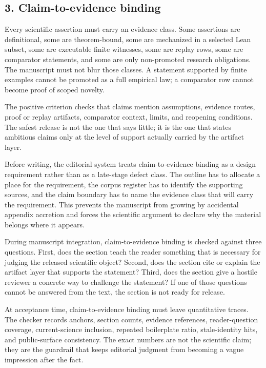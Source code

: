 \subsection{3. Claim-to-evidence binding}

Every scientific assertion must carry an evidence class. Some assertions are definitional, some are theorem-bound, some are mechanized in a selected Lean subset, some are executable finite witnesses, some are replay rows, some are comparator statements, and some are only non-promoted research obligations. The manuscript must not blur those classes. A statement supported by finite examples cannot be promoted as a full empirical law; a comparator row cannot become proof of scoped novelty.


The positive criterion checks that claims mention assumptions, evidence routes, proof or replay artifacts, comparator context, limits, and reopening conditions. The safest release is not the one that says little; it is the one that states ambitious claims only at the level of support actually carried by the artifact layer.


Before writing, the editorial system treats claim-to-evidence binding as a design requirement rather than as a late-stage defect class. The outline has to allocate a place for the requirement, the corpus register has to identify the supporting sources, and the claim boundary has to name the evidence class that will carry the requirement. This prevents the manuscript from growing by accidental appendix accretion and forces the scientific argument to declare why the material belongs where it appears.


During manuscript integration, claim-to-evidence binding is checked against three questions. First, does the section teach the reader something that is necessary for judging the released scientific object? Second, does the section cite or explain the artifact layer that supports the statement? Third, does the section give a hostile reviewer a concrete way to challenge the statement? If one of those questions cannot be answered from the text, the section is not ready for release.


At acceptance time, claim-to-evidence binding must leave quantitative traces. The checker records anchors, section counts, evidence references, reader-question coverage, current-science inclusion, repeated boilerplate ratio, stale-identity hits, and public-surface consistency. The exact numbers are not the scientific claim; they are the guardrail that keeps editorial judgment from becoming a vague impression after the fact.


